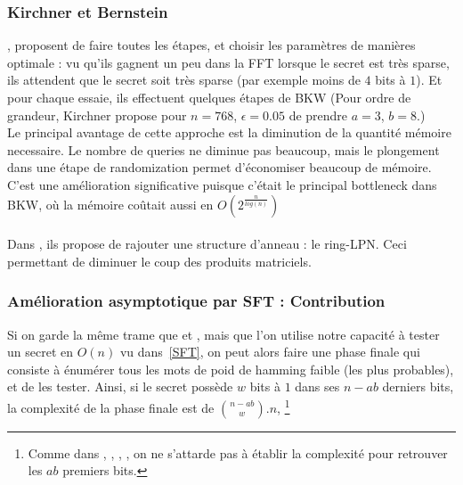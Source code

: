 \documentclass{article}		%
\theoremstyle{definition}
\theoremstyle{plain}
\begin{document}
\subsubsection{Kirchner et Bernstein}
\cite{Bernstein}, \cite{Kirchner} proposent de faire toutes les étapes, et
choisir les paramètres de manières optimale : vu qu'ils gagnent un peu
dans la FFT lorsque le secret est très sparse, ils attendent que le
secret soit très sparse (par exemple moins de $4$ bits à $1$). Et pour
chaque essaie, ils effectuent quelques étapes de BKW (Pour ordre de
grandeur, Kirchner propose
pour $n=768$, $\epsilon=0.05$ de prendre $a=3$, $b=8$.)
\\Le principal avantage de cette approche est la diminution de la
quantité mémoire necessaire. Le nombre de queries ne diminue pas
beaucoup, mais le plongement dans une étape de randomization permet
d'économiser beaucoup de mémoire. C'est une amélioration significative
puisque c'était le principal bottleneck dans BKW, où la mémoire coûtait
aussi en $O(2^\frac{n}{log(n)})$ 
\\\\
Dans \cite{Bernstein}, ils propose de rajouter une structure
d'anneau : le ring-LPN. Ceci permettant de diminuer le coup des produits
matriciels.  

\subsubsection{Amélioration asymptotique par SFT : Contribution}
\cite{Vaudenay}
Si on garde la même trame que \cite{Kirchner} et \cite{Bernstein}, mais que l'on utilise notre
capacité à tester un secret en $O(n)$ vu dans~\ref{SFT}, on peut alors faire une phase
finale qui consiste à énumérer tous les mots de poid de hamming faible (les plus
probables), et de les tester. Ainsi, si le secret possède $w$ bits à $1$
dans ses $n-ab$ derniers bits,
la complexité de la phase finale est de $\binom{n-ab}{w}.n$, \footnote{Comme dans
\cite{LF}, \cite{BKW}, \cite{Kirchner}, \cite{Bernstein}, on ne s'attarde
pas à établir la complexité pour retrouver les $ab$ premiers bits.}
\end{document}
